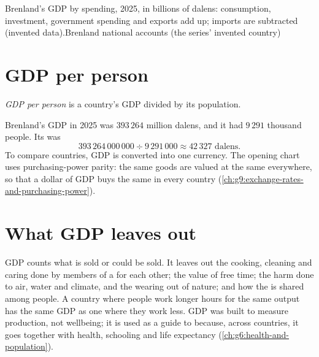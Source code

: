 \begin{omchart}{Brenland's GDP by spending, 2025, in billions of dalens: consumption, investment,
government spending and exports add up; imports are subtracted (invented data).}{Brenland
national accounts (the series' invented country)}
\end{omchart}

\section{GDP per person}

\begin{definition}\label{def:g8:gdp:gdp-per-person}
\emph{GDP per person} is a country's GDP divided by its population.
\end{definition}

Brenland's GDP in 2025 was $393\,264$ million dalens, and it had $9\,291$ thousand people. Its  was
\[
393\,264\,000\,000 \div 9\,291\,000 \approx 42\,327 \text{ dalens}.
\]
To compare countries, GDP is converted into one currency. The opening chart uses
purchasing-power parity: the same goods are valued at the same  everywhere, so that a
dollar of GDP buys the same in every country (\cref{ch:g9:exchange-rates-and-purchasing-power}).

\section{What GDP leaves out}

\begin{measure}
GDP counts what is sold or could be sold. It leaves out the cooking, cleaning and caring done
by members of a  for each other; the value of free time; the harm done to air, water
and climate, and the wearing out of nature; and how the  is shared among people. A country
where people work longer hours for the same output has the same GDP as one where they work
less. GDP was built to measure production, not wellbeing; it is used as a guide to  because, across countries, it goes together with health, schooling and life
expectancy (\cref{ch:g6:health-and-population}).
\end{measure}

